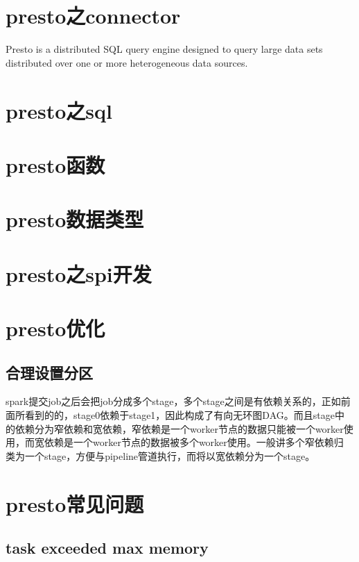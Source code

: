 \documentclass[letterpaper,10pt,english]{sphinxmanual}
\begin{document}
\chapter{presto之connector}
\label{\detokenize{connector:prestoconnector}}\label{\detokenize{connector::doc}}
Presto is a distributed SQL query engine designed to query large data sets distributed over one or more heterogeneous data sources.


\chapter{presto之sql}
\label{\detokenize{sql:prestosql}}\label{\detokenize{sql::doc}}

\chapter{presto函数}
\label{\detokenize{functions:presto}}\label{\detokenize{functions::doc}}

\chapter{presto数据类型}
\label{\detokenize{datatypes:presto}}\label{\detokenize{datatypes::doc}}

\chapter{presto之spi开发}
\label{\detokenize{spi:prestospi}}\label{\detokenize{spi::doc}}

\chapter{presto优化}
\label{\detokenize{optimize:presto}}\label{\detokenize{optimize::doc}}

\section{合理设置分区}
\label{\detokenize{optimize/partition:id1}}\label{\detokenize{optimize/partition::doc}}
spark提交job之后会把job分成多个stage，多个stage之间是有依赖关系的，正如前面所看到的的，stage0依赖于stage1，因此构成了有向无环图DAG。而且stage中
的依赖分为窄依赖和宽依赖，窄依赖是一个worker节点的数据只能被一个worker使用，而宽依赖是一个worker节点的数据被多个worker使用。一般讲多个窄依赖归
类为一个stage，方便与pipeline管道执行，而将以宽依赖分为一个stage。


\chapter{presto常见问题}
\label{\detokenize{faq:presto}}\label{\detokenize{faq::doc}}

\section{task exceeded max memory}
\label{\detokenize{faq/memory:task-exceeded-max-memory}}\label{\detokenize{faq/memory::doc}}


\renewcommand{\indexname}{索引}
\printindex
\end{document}
